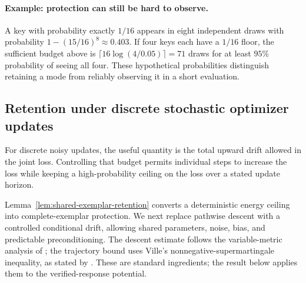 \documentclass{article}
\newcommand{\1}{\mathbf 1}
\theoremstyle{remark}
\theoremstyle{definition}
\theoremstyle{plain}
\begin{document}
\paragraph{Example: protection can still be hard to observe.}
A key with probability exactly $1/16$ appears in eight independent draws
with probability $1-(15/16)^8\approx0.403$. If four keys each have a $1/16$
floor, the sufficient budget above is
$\lceil16\log(4/0.05)\rceil=71$ draws for at least $95\%$ probability of
seeing all four. These hypothetical probabilities distinguish retaining a
mode from reliably observing it in a short evaluation.

\subsection{Retention under discrete stochastic optimizer updates}
\label{app:theory-optimizer}

For discrete noisy updates, the useful quantity is the total upward drift
allowed in the joint loss. Controlling that budget permits individual steps
to increase the loss while keeping a high-probability ceiling on the loss
over a stated update horizon.

Lemma~\ref{lem:shared-exemplar-retention} converts a deterministic energy
ceiling into complete-exemplar protection. We next replace pathwise descent
with a controlled conditional drift, allowing shared parameters, noise,
bias, and predictable preconditioning. The descent estimate follows the
variable-metric analysis of \citet[Section~2]{wang2017sqn}; the trajectory
bound uses Ville's nonnegative-supermartingale inequality, as stated by
\citet[Lemma~1]{howard2020timeuniform}. These are standard ingredients;
the result below applies them to the verified-response potential.
\end{document}
